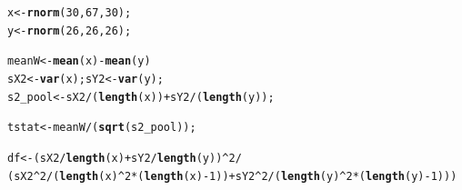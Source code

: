 \documentclass{beamer}\usepackage[]{graphicx}\usepackage[]{color}
\makeatletter
\newcommand{\hlnum}[1]{\textcolor[rgb]{0.2,0.2,0.2}{#1}}%
\newcommand{\hlopt}[1]{\textcolor[rgb]{0.102,0.102,0.102}{#1}}%
\newcommand{\hlstd}[1]{\textcolor[rgb]{0.102,0.102,0.102}{#1}}%
\newcommand{\hlkwb}[1]{\textcolor[rgb]{0.102,0.102,0.102}{#1}}%
\newcommand{\hlkwd}[1]{\textcolor[rgb]{0.102,0.102,0.102}{\textbf{#1}}}%
\newenvironment{kframe}{%
 \def\at@end@of@kframe{}%
 \ifinner\ifhmode%
  \def\at@end@of@kframe{\end{minipage}}%
  \begin{minipage}{\columnwidth}%
 \fi\fi%
 \def\FrameCommand##1{\hskip\@totalleftmargin \hskip-\fboxsep
 \colorbox{shadecolor}{##1}\hskip-\fboxsep
     \hskip-\linewidth \hskip-\@totalleftmargin \hskip\columnwidth}%
 \MakeFramed {\advance\hsize-\width
   \@totalleftmargin\z@ \linewidth\hsize
   \@setminipage}}%
 {\par\unskip\endMakeFramed%
 \at@end@of@kframe}
\newenvironment{knitrout}{}{} %
\renewenvironment{knitrout}{\begin{spacing}{0.75}\begin{tiny}}{\end{tiny}\end{spacing}}
\makeatother
\begin{document}
\begin{frame}[fragile]

\begin{knitrout}\small
{}\color{fgcolor}\begin{kframe}
\begin{alltt}
\hlstd{x} \hlkwb{<-} \hlkwd{rnorm}\hlstd{(}\hlnum{30}\hlstd{,} \hlnum{67}\hlstd{,} \hlnum{30}\hlstd{);}
\hlstd{y} \hlkwb{<-} \hlkwd{rnorm}\hlstd{(}\hlnum{26}\hlstd{,} \hlnum{26}\hlstd{,} \hlnum{26}\hlstd{);}

\hlstd{meanW} \hlkwb{<-} \hlkwd{mean}\hlstd{(x)} \hlopt{-} \hlkwd{mean}\hlstd{(y)}
\hlstd{sX2} \hlkwb{<-} \hlkwd{var}\hlstd{(x); sY2} \hlkwb{<-} \hlkwd{var}\hlstd{(y);}
\hlstd{s2_pool} \hlkwb{<-} \hlstd{sX2}\hlopt{/}\hlstd{(}\hlkwd{length}\hlstd{(x))} \hlopt{+} \hlstd{sY2}\hlopt{/}\hlstd{(}\hlkwd{length}\hlstd{(y));}

\hlstd{tstat} \hlkwb{<-} \hlstd{meanW}\hlopt{/} \hlstd{(}\hlkwd{sqrt}\hlstd{(s2_pool));}

\hlstd{df} \hlkwb{<-} \hlstd{(sX2}\hlopt{/}\hlkwd{length}\hlstd{(x)} \hlopt{+} \hlstd{sY2}\hlopt{/}\hlkwd{length}\hlstd{(y))}\hlopt{^}\hlnum{2}\hlopt{/}
  \hlstd{(sX2}\hlopt{^}\hlnum{2}\hlopt{/}\hlstd{(}\hlkwd{length}\hlstd{(x)}\hlopt{^}\hlnum{2}\hlopt{*}\hlstd{(}\hlkwd{length}\hlstd{(x)}\hlopt{-}\hlnum{1}\hlstd{))} \hlopt{+} \hlstd{sY2}\hlopt{^}\hlnum{2}\hlopt{/}\hlstd{(}\hlkwd{length}\hlstd{(y)}\hlopt{^}\hlnum{2}\hlopt{*}\hlstd{(}\hlkwd{length}\hlstd{(y)}\hlopt{-}\hlnum{1}\hlstd{)))}
\end{alltt}
\end{kframe}
\end{knitrout}

\end{frame}
\end{document}
